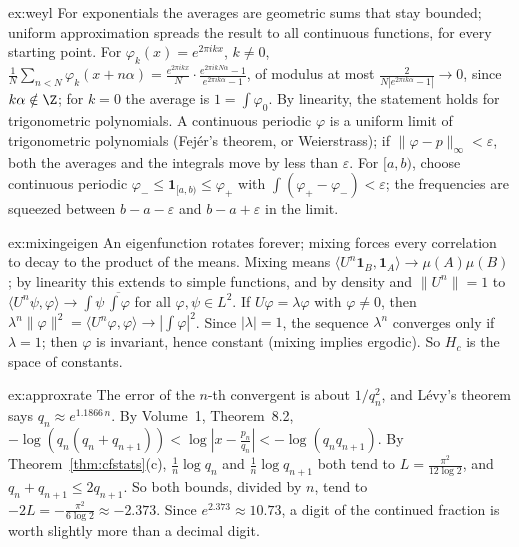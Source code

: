 \begin{solution}{ex:weyl}
\idea For exponentials the averages are geometric sums that stay bounded; uniform approximation spreads the result to all continuous functions, for every starting point.
\writeup For $\varphi_k(x)=e^{2\pi ikx}$, $k\neq0$, $\frac1N\sum_{n<N}\varphi_k(x+n\alpha)=\frac{e^{2\pi ikx}}N\cdot\frac{e^{2\pi ikN\alpha}-1}{e^{2\pi ik\alpha}-1}$, of modulus at most $\frac2{N|e^{2\pi ik\alpha}-1|}\to0$, since $k\alpha\notin\Z$; for $k=0$ the average is $1=\int\varphi_0$. By linearity, the
statement holds for trigonometric polynomials. A continuous periodic $\varphi$ is a uniform limit of trigonometric polynomials (Fej\'er's theorem, or Weierstrass); if $\|\varphi-p\|_\infty<\varepsilon$, both the averages and the integrals move by less than $\varepsilon$.
For $[a,b)$, choose continuous periodic $\varphi_-\le\mathbf 1_{[a,b)}\le\varphi_+$ with $\int(\varphi_+-\varphi_-)<\varepsilon$; the frequencies are squeezed between $b-a-\varepsilon$ and $b-a+\varepsilon$ in the limit.
\end{solution}

\begin{solution}{ex:mixingeigen}
\idea An eigenfunction rotates forever; mixing forces every correlation to decay to the product of the means.
\writeup Mixing means $\langle U^n\mathbf 1_B,\mathbf 1_A\rangle\to\mu(A)\mu(B)$; by linearity this extends to simple functions, and by density and $\|U^n\|=1$ to $\langle U^n\psi,\varphi\rangle\to\int\psi\,\overline{\int\varphi}$ for all $\varphi,\psi\in L^2$. If $U\varphi=\lambda\varphi$
with $\varphi\neq0$, then $\lambda^n\|\varphi\|^2=\langle U^n\varphi,\varphi\rangle\to|\int\varphi|^2$. Since $|\lambda|=1$, the sequence $\lambda^n$ converges only if $\lambda=1$; then $\varphi$ is invariant, hence constant (mixing implies ergodic). So $H_c$ is the space of constants.
\end{solution}

\begin{solution}{ex:approxrate}
\idea The error of the $n$-th convergent is about $1/q_n^2$, and L\'evy's theorem says $q_n\approx e^{1.1866\,n}$.
\writeup By Volume~1, Theorem~8.2, $-\log(q_n(q_n+q_{n+1}))<\log|x-\frac{p_n}{q_n}|<-\log(q_nq_{n+1})$. By Theorem~\ref{thm:cfstats}(c), $\frac1n\log q_n$ and $\frac1n\log q_{n+1}$ both tend to $L=\frac{\pi^2}{12\log2}$, and $q_n+q_{n+1}\le2q_{n+1}$. So both bounds, divided by $n$, tend to $-2L=-\frac{\pi^2}{6\log2}\approx-2.373$.
Since $e^{2.373}\approx10.73$, a digit of the continued fraction is worth slightly more than a decimal digit.
\end{solution}

